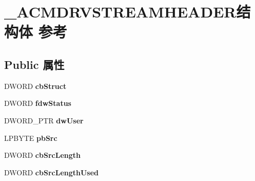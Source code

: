 \hypertarget{struct___a_c_m_d_r_v_s_t_r_e_a_m_h_e_a_d_e_r}{}\section{\+\_\+\+A\+C\+M\+D\+R\+V\+S\+T\+R\+E\+A\+M\+H\+E\+A\+D\+E\+R结构体 参考}
\label{struct___a_c_m_d_r_v_s_t_r_e_a_m_h_e_a_d_e_r}
\subsection*{Public 属性}
\begin{DoxyCompactItemize}
\item 
\mbox{\label{struct___a_c_m_d_r_v_s_t_r_e_a_m_h_e_a_d_e_r_a8026936fb86f287ad9328496e908b96a}} 
D\+W\+O\+RD {\bfseries cb\+Struct}
\item 
\mbox{\label{struct___a_c_m_d_r_v_s_t_r_e_a_m_h_e_a_d_e_r_ab8878eb5c491d75ddfd706a22b38290c}} 
D\+W\+O\+RD {\bfseries fdw\+Status}
\item 
\mbox{\label{struct___a_c_m_d_r_v_s_t_r_e_a_m_h_e_a_d_e_r_a228ff00055709e9c8352c9ad4e2da3a3}} 
D\+W\+O\+R\+D\+\_\+\+P\+TR {\bfseries dw\+User}
\item 
\mbox{\label{struct___a_c_m_d_r_v_s_t_r_e_a_m_h_e_a_d_e_r_aa593cbc92741ca001c746a1fbc239c50}} 
L\+P\+B\+Y\+TE {\bfseries pb\+Src}
\item 
\mbox{\label{struct___a_c_m_d_r_v_s_t_r_e_a_m_h_e_a_d_e_r_ae567bffe0b64e74cd0b492e8d2efbd0d}} 
D\+W\+O\+RD {\bfseries cb\+Src\+Length}
\item 
\mbox{\label{struct___a_c_m_d_r_v_s_t_r_e_a_m_h_e_a_d_e_r_ae3691643350bd5a01dc8e55581c8016c}} 
D\+W\+O\+RD {\bfseries cb\+Src\+Length\+Used}
\item 
\mbox{\label{struct___a_c_m_d_r_v_s_t_r_e_a_m_h_e_a_d_e_r_ac8ca4e0f9501aa44ba0e0ac3ca0b18ce}} 

\end{DoxyCompactItemize}
